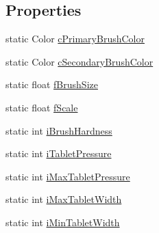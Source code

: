 \subsection*{Properties}
\begin{DoxyCompactItemize}
\item 
static Color \mbox{\hyperlink{class_paint___program_1_1_shared_settings_a42ba0962e89559aba625ca2d80f47393}{c\+Primary\+Brush\+Color}}
\item 
static Color \mbox{\hyperlink{class_paint___program_1_1_shared_settings_a43fe34697193e7a1de304c02f25e7ea4}{c\+Secondary\+Brush\+Color}}
\item 
static float \mbox{\hyperlink{class_paint___program_1_1_shared_settings_a9c351495bcafa6934d21bea1a7ba8d0a}{f\+Brush\+Size}}
\item 
static float \mbox{\hyperlink{class_paint___program_1_1_shared_settings_a92210c5529ddbc52b3e47b372f1d932f}{f\+Scale}}
\item 
static int \mbox{\hyperlink{class_paint___program_1_1_shared_settings_a9d5a7c50141f47a892ba9177ff7e1757}{i\+Brush\+Hardness}}
\item 
static int \mbox{\hyperlink{class_paint___program_1_1_shared_settings_a0023b7cac5df9daf42d660b250c430ea}{i\+Tablet\+Pressure}}
\item 
static int \mbox{\hyperlink{class_paint___program_1_1_shared_settings_a5e0a43f5518864f4b15fc0ec92b002a8}{i\+Max\+Tablet\+Pressure}}
\item 
static int \mbox{\hyperlink{class_paint___program_1_1_shared_settings_ab2b2d020abcafdec7f317dc1383ac307}{i\+Max\+Tablet\+Width}}
\item 
static int \mbox{\hyperlink{class_paint___program_1_1_shared_settings_a1cee7193c8d1075bc5280687e366300f}{i\+Min\+Tablet\+Width}}

\end{DoxyCompactItemize}
